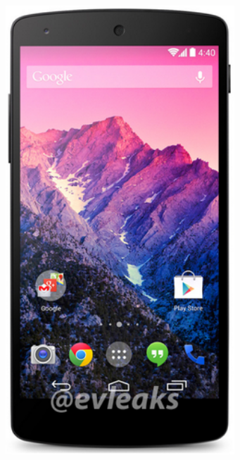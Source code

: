 \documentclass{beamer}
\begin{document}
\begin{frame}
\begin{columns}
\begin{column}{0.3 \textwidth}
		\end{column}
		\begin{column}{0.3 \textwidth}
		\pause
			\begin{figure}
			\centering
				\includegraphics[width=1.00\textwidth]{img/nexus.png}
			\label{fig:iphone}
		\end{figure}

\end{column}
\end{columns}
\end{frame}
\end{document}
